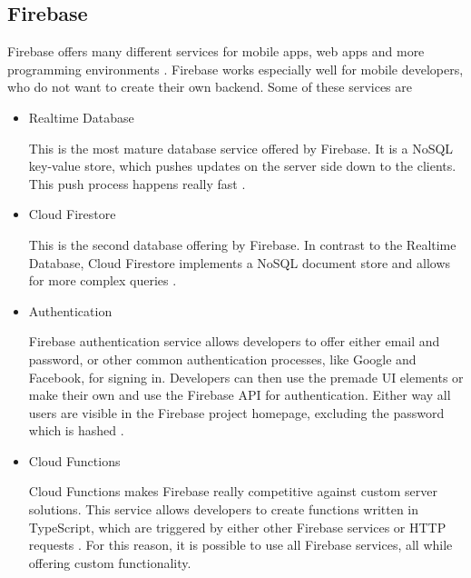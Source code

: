 \subsection{Firebase}
Firebase offers many different services for mobile apps, web apps and more programming environments \cite{cheng2018build}. Firebase works especially well for mobile developers, who do not want to create their own backend. Some of these services are 
\begin{itemize}
    \item Realtime Database
    
    This is the most mature database service offered by Firebase. It is a NoSQL key-value store, which pushes updates on the server side down to the clients. This push process happens really fast \cite{FirebaseDoc}. 
    \item Cloud Firestore
    
    This is the second database offering by Firebase. In contrast to the Realtime Database, Cloud Firestore implements a NoSQL document store and allows for more complex queries \cite{FirebaseDoc}.
    
    \item Authentication
    
    Firebase authentication service allows developers to offer either email and password, or other common authentication processes, like Google and Facebook, for signing in. Developers can then use the premade UI elements or make their own and use the Firebase API for authentication. Either way all users are visible in the Firebase project homepage, excluding the password which is hashed \cite{FirebaseDoc}.
    
    \item Cloud Functions
    
    Cloud Functions makes Firebase really competitive against custom server solutions. This service allows developers to create functions written in TypeScript, which are triggered by either other Firebase services or HTTP requests \cite{FirebaseDoc}.  For this reason, it is possible to use all Firebase services, all while offering custom functionality.
\end{itemize}

